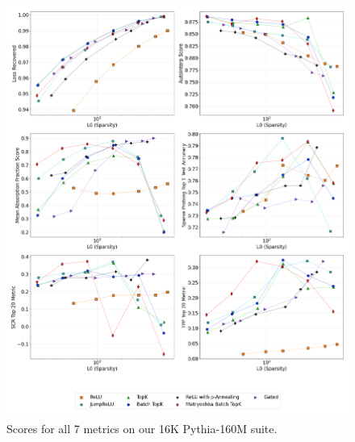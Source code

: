\documentclass{article}
\theoremstyle{plain}
\theoremstyle{definition}
\theoremstyle{remark}
\begin{document}
\begin{figure}[h!]
    \centering
    \includegraphics[width=\columnwidth]{images/plot_2x4_sae_bench_pythia-160m_16k_architecture_series_layer_8.png}
    \caption{Scores for all 7 metrics on our 16K Pythia-160M suite.}
\end{figure}
\label{fig:plot_2x4_sae_bench_pythia-160m_16k_architecture_series_layer_8}
\end{document}
